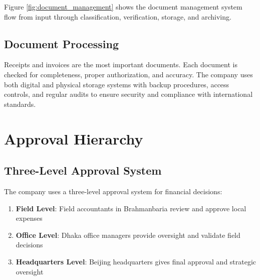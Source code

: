 Figure \ref{fig:document_management} shows the document management system flow from input through classification, verification, storage, and archiving.

\subsection{Document Processing}
Receipts and invoices are the most important documents. Each document is checked for completeness, proper authorization, and accuracy. The company uses both digital and physical storage systems with backup procedures, access controls, and regular audits to ensure security and compliance with international standards.

\vspace{0.5em}
\section{Approval Hierarchy}

\subsection{Three-Level Approval System}
The company uses a three-level approval system for financial decisions:

\begin{enumerate}[leftmargin=*, itemsep=0.25em]
    \item \textbf{Field Level}: Field accountants in Brahmanbaria review and approve local expenses
    \item \textbf{Office Level}: Dhaka office managers provide oversight and validate field decisions  
    \item \textbf{Headquarters Level}: Beijing headquarters gives final approval and strategic oversight
\end{enumerate}

